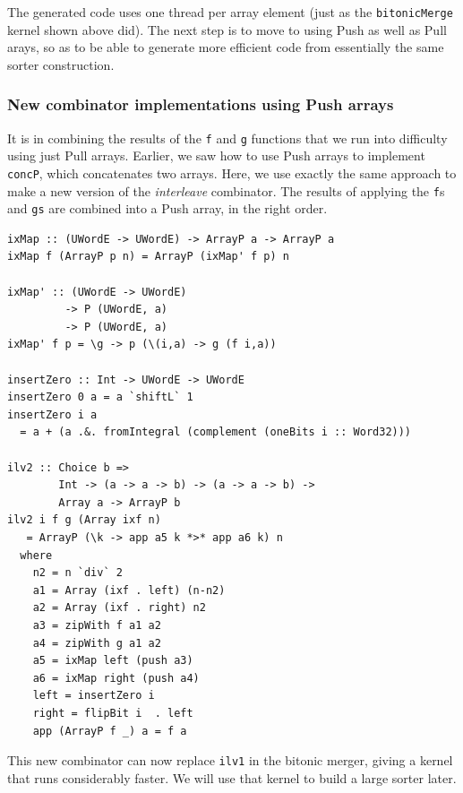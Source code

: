 The generated code
uses
one thread per array element (just as the {\tt bitonicMerge}
kernel shown above did). The next step is to move to using Push as
well as Pull arays, so as to be able to generate more efficient code
from essentially the same sorter construction.

\subsubsection{New combinator implementations using Push arrays}


It is in combining the results of the {\tt f} and {\tt g} functions
that we run into difficulty using just Pull arrays.
Earlier, we saw how to use Push arrays to implement {\tt concP},
which concatenates two arrays.
Here, we use exactly the same approach to make a new version of
the {\em interleave} combinator. The results of applying
the {\tt f}s and {\tt gs} are combined into a Push array, in the right
order.
\begin{codesize}
\begin{verbatim}
ixMap :: (UWordE -> UWordE) -> ArrayP a -> ArrayP a 
ixMap f (ArrayP p n) = ArrayP (ixMap' f p) n

ixMap' :: (UWordE -> UWordE) 
         -> P (UWordE, a)
         -> P (UWordE, a) 
ixMap' f p = \g -> p (\(i,a) -> g (f i,a))

insertZero :: Int -> UWordE -> UWordE
insertZero 0 a = a `shiftL` 1
insertZero i a 
  = a + (a .&. fromIntegral (complement (oneBits i :: Word32)))

ilv2 :: Choice b => 
        Int -> (a -> a -> b) -> (a -> a -> b) -> 
        Array a -> ArrayP b
ilv2 i f g (Array ixf n) 
   = ArrayP (\k -> app a5 k *>* app a6 k) n
  where
    n2 = n `div` 2
    a1 = Array (ixf . left) (n-n2)
    a2 = Array (ixf . right) n2
    a3 = zipWith f a1 a2
    a4 = zipWith g a1 a2
    a5 = ixMap left (push a3)
    a6 = ixMap right (push a4)
    left = insertZero i
    right = flipBit i  . left
    app (ArrayP f _) a = f a
\end{verbatim}
\end{codesize}
\noindent
This new combinator can now replace {\tt ilv1} in the bitonic
merger, giving a kernel that runs considerably faster. We will use
that kernel to build a large sorter later.

